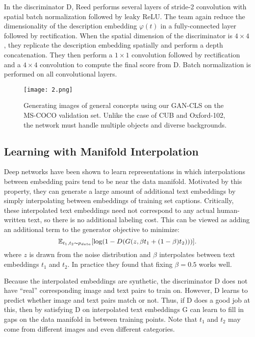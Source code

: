 \documentclass[10pt,twocolumn,letterpaper]{article}
\begin{document}
In the discriminator D, Reed performs several layers of stride-2 convolution with spatial batch normalization \cite{ioffe2015batch} followed by leaky ReLU. The team again reduce the dimensionality of the description embedding $\varphi(t)$ in a fully-connected layer followed by rectification. When the spatial dimension of the discriminator is $4\times 4$, they replicate the description embedding spatially and perform a depth concatenation. They then perform a $1\times 1$ convolution followed by rectification and a $4\times 4$ convolution to compute the final score from D. Batch normalization is performed on all convolutional layers.
\begin{figure*}[b]
	\begin{center}
		\texttt{[image: 2.png]}
	\end{center}
	\caption{Generating images of general concepts using our GAN-CLS on the MS-COCO validation set. Unlike the case of CUB and Oxford-102, the network must handle multiple objects and diverse backgrounds.}
	\label{p3}
\end{figure*}

\subsection{Learning with Manifold Interpolation}

Deep networks have been shown to learn representations in which interpolations between embedding pairs tend to be near the data manifold. Motivated by this property, they can generate a large amount of additional text embeddings by simply interpolating between embeddings of training set captions. Critically, these interpolated text embeddings need not correspond to any actual human-written text, so there is no additional labeling cost. This can be viewed as adding an additional term to the generator objective to minimize:
\begin{equation}
\mathbb{E}_{t_1,t_2\thicksim p_{data}}[\log(1-D(G(z,\beta t_1+(1-\beta)t_2)))].   \label{q1}
\end{equation}
where $z$ is drawn from the noise distribution and $\beta$ interpolates between text embeddings $t_1$ and $t_2$. In practice they found that fixing $\beta = 0.5$ works well.

Because the interpolated embeddings are synthetic, the discriminator D does not have ``real'' corresponding image and text pairs to train on. However, D learns to predict whether image and text pairs match or not. Thus, if D does a good job at this, then by satisfying D on interpolated text embeddings G can learn to fill in gaps on the data manifold in between training points. Note that $t_1$ and $t_2$ may come from different images and even different categories. 
\end{document}
